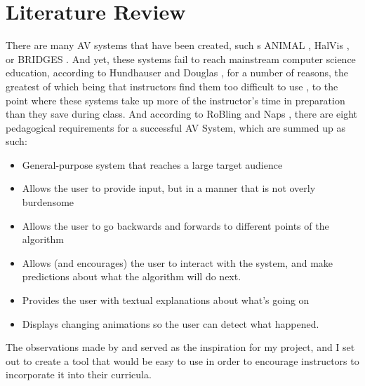 \chapter{Literature Review}
\label{literature-review}
There are many AV systems that have been created, such s 
ANIMAL \cite{h}, HalVis \cite{i}, or BRIDGES \cite{g}. 
And yet, these systems fail to reach mainstream computer science education,
according to Hundhauser and Douglas \cite{j}, 
for a number of reasons, the greatest of which being that 
instructors find them too difficult to use , 
to the point where these systems take up more of the instructor's time 
in preparation than they save during class. 
And according to RoBling and Naps \cite{f}, there are eight 
pedagogical requirements for a successful AV System, which are summed up as such: 
\begin{itemize}
	\item General-purpose system that reaches a large target audience
	\item Allows the user to provide input, but in a manner that is not overly burdensome
	\item Allows the user to go backwards and forwards to different points of the 
		algorithm
	\item Allows (and encourages) the user to interact with the system, and make
		predictions about what the algorithm will do next. 
	\item Provides the user with textual explanations about what's going on
	\item Displays changing animations so the user can detect what happened. 
\end{itemize}
The observations made by \cite{j} and \cite{f}
served as the inspiration for my project, 
and I set out to create a tool that would be easy to use
in order to encourage instructors to incorporate it into their curricula. 

